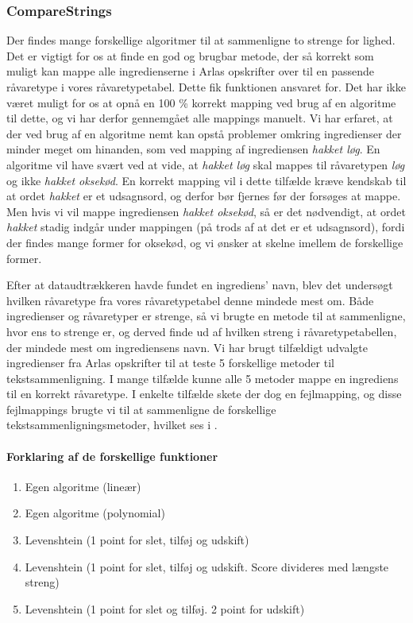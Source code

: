\subsubsection{CompareStrings}
Der findes mange forskellige algoritmer til at sammenligne to strenge for lighed. Det er vigtigt for os at finde en god og brugbar metode, der så korrekt som muligt kan mappe alle ingredienserne i Arlas opskrifter over til en passende råvaretype i vores råvaretypetabel. Dette fik funktionen  ansvaret for. Det har ikke været muligt for os at opnå en 100 \% korrekt mapping ved brug af en algoritme til dette, og vi har derfor gennemgået alle mappings manuelt. Vi har erfaret, at der ved brug af en algoritme nemt kan opstå problemer omkring ingredienser der minder meget om hinanden, som \fx ved mapping af ingrediensen \textit{hakket løg}. En algoritme vil have svært ved at vide, at \textit{hakket løg} skal mappes til råvaretypen \textit{løg} og ikke \textit{hakket oksekød}. En korrekt mapping vil i dette tilfælde kræve kendskab til at ordet \textit{hakket} er et udsagnsord, og derfor bør fjernes før der forsøges at mappe. Men hvis vi vil mappe ingrediensen \textit{hakket oksekød}, så er det nødvendigt, at ordet \textit{hakket} stadig indgår under mappingen (på trods af at det er et udsagnsord), fordi der findes mange former for oksekød, og vi ønsker at skelne imellem de forskellige former.

Efter at dataudtrækkeren havde fundet en ingrediens' navn, blev det undersøgt hvilken råvaretype fra vores råvaretypetabel denne mindede mest om. Både ingredienser og råvaretyper er strenge, så vi brugte en metode til at sammenligne, hvor ens to strenge er, og derved finde ud af hvilken streng i råvaretypetabellen, der mindede mest om ingrediensens navn.
Vi har brugt tilfældigt udvalgte ingredienser fra Arlas opskrifter til at teste 5 forskellige metoder til tekstsammenligning. I mange tilfælde kunne alle 5 metoder mappe en ingrediens til en korrekt råvaretype. I enkelte tilfælde skete der dog en fejlmapping, og disse fejlmappings brugte vi til at sammenligne de forskellige tekstsammenligningsmetoder, hvilket ses i .

\paragraph{Forklaring af de forskellige  funktioner}
\begin{enumerate}[noitemsep]
  \item Egen algoritme (lineær)
  \item Egen algoritme (polynomial)
  \item Levenshtein (1 point for slet, tilføj og udskift)\cite{rubygemlevenshtein}
  \item Levenshtein (1 point for slet, tilføj og udskift. Score divideres med længste streng)\cite{rubygemlevenshtein}
  \item Levenshtein (1 point for slet og tilføj. 2 point for udskift)\cite{rubygemlevenshtein}
\end{enumerate}


